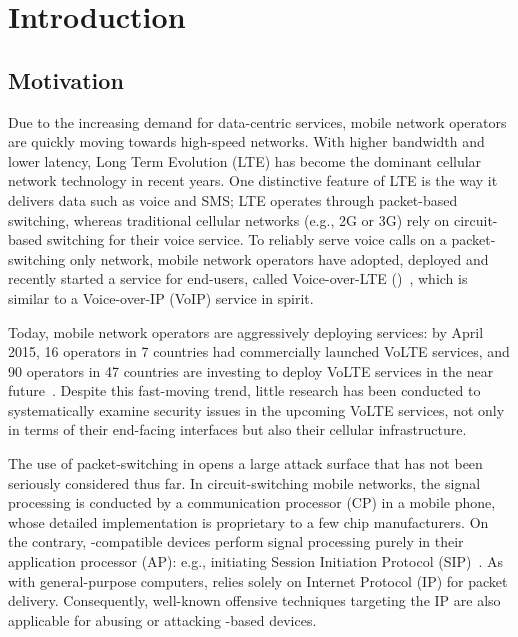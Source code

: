 \chapter{Introduction}
\label{sec:intro}

\section{Motivation}

Due to the increasing demand for data-centric services,
mobile network operators are quickly moving towards high-speed networks.
%
With higher bandwidth and lower latency, Long Term Evolution (LTE) has
become the dominant cellular network technology in recent years.
%
One distinctive feature of LTE is the way it delivers data such as voice
and SMS; LTE operates through packet-based switching, whereas traditional
cellular networks (e.g., 2G or 3G) rely on circuit-based switching for
their voice service.
%
To reliably serve voice calls on a packet-switching only network, 
mobile network operators have adopted, deployed
and recently started a service for end-users, called Voice-over-LTE
(\vt)~\cite{gsma2014volte}, which is similar to a Voice-over-IP
(VoIP) service in spirit.

Today, mobile network operators are aggressively deploying \vt services:
by April 2015, 16 operators in 7 countries
had commercially launched VoLTE services, 
and 90 operators in 47 countries are
investing to deploy VoLTE services in the near future~\cite{global2015evolution}.
%
Despite this fast-moving trend,
little research has been conducted to
systematically examine security issues
in the upcoming VoLTE services,
not only in terms of their end-facing interfaces but also their cellular
infrastructure.


The use of packet-switching in \vt opens a large
attack surface that has not been seriously considered thus far.
%
In circuit-switching mobile networks, the signal processing is conducted by a
communication processor (CP) in a mobile phone, whose detailed implementation
is proprietary to a few chip manufacturers.
%
On the contrary, \vt-compatible devices perform signal processing
purely in their application processor (AP):
e.g., initiating Session Initiation Protocol (SIP)~\cite{rosenberg2002sip}.
%
As with general-purpose computers,
\vt relies solely on Internet Protocol (IP) for packet delivery.
Consequently, well-known offensive techniques
targeting the IP are also applicable for abusing or attacking \vt-based devices.

